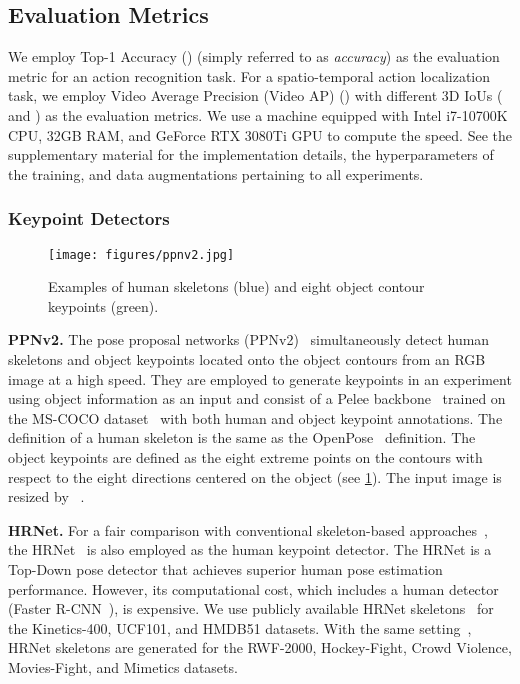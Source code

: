 \documentclass[10pt,twocolumn,letterpaper]{article}
\begin{document}
\subsection{Evaluation Metrics}
We employ Top-1 Accuracy () (simply referred to as {\it accuracy}) as the evaluation metric for an action recognition task.
For a spatio-temporal action localization task, we employ Video Average Precision (Video AP) () with different 3D IoUs ( and ) as the evaluation metrics.
We use a machine equipped with Intel i7-10700K CPU, 32GB RAM, and GeForce RTX 3080Ti GPU to compute the speed.
See the supplementary material for the implementation details, the hyperparameters of the training, and data augmentations pertaining to all experiments.

\subsubsection{Keypoint Detectors}
\label{sec:keypoint_estimator}

\begin{figure}[tb]
  \centering
  \texttt{[image: figures/ppnv2.jpg]}
  \caption{Examples of human skeletons (blue) and eight object contour keypoints (green).}
  \label{fig:ppnv2}
\end{figure}

\noindent \textbf{PPNv2.} The pose proposal networks (PPNv2)~\cite{Sekii2018ECCV, PPNv2} simultaneously detect human skeletons and object keypoints located onto the object contours from an RGB image at a high speed.
They are employed to generate keypoints in an experiment using object information as an input and consist of a Pelee backbone~\cite{Wang2018Neurips} trained on the MS-COCO dataset~\cite{Lin2014ECCV} with both human and object keypoint annotations.
The definition of a human skeleton is the same as the OpenPose~\cite{Cao2017CVPR} definition.
The object keypoints are defined as the eight extreme points on the contours with respect to the eight directions centered on the object (see \cref{fig:ppnv2}).
The input image is resized by ~.

\noindent \textbf{HRNet.} For a fair comparison with conventional skeleton-based approaches~\cite{Su2020ECCV,Liu2020CVPR,Moon2021CVPR,Duan2022CVPR}, the HRNet~\cite{Sun2019CVPR} is also employed as the human keypoint detector.
The HRNet is a Top-Down pose detector that achieves superior human pose estimation performance.
However, its computational cost, which includes a human detector (Faster R-CNN~\cite{Ren2015Neurips}), is expensive.
We use publicly available HRNet skeletons~\cite{Duan2022CVPR} for the Kinetics-400, UCF101, and HMDB51 datasets.
With the same setting~\cite{Duan2022CVPR}, HRNet skeletons are generated for the RWF-2000, Hockey-Fight, Crowd Violence, Movies-Fight, and Mimetics datasets.
\end{document}
